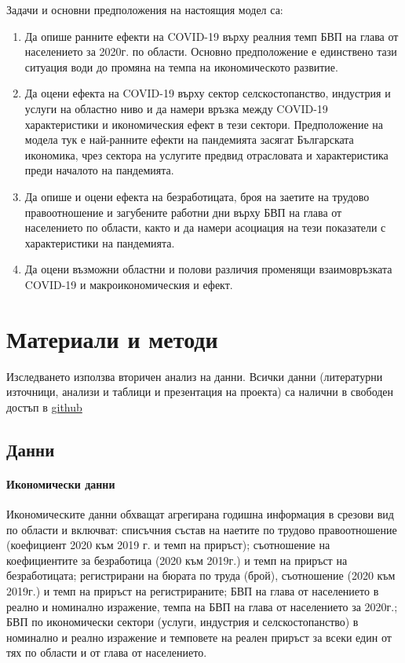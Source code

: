 \documentclass[a4paper,12pt]{article}
\begin{document}
Задачи и основни предположения на настоящия модел са:
\begin{enumerate}
\item Да опише ранните ефекти на COVID-19 върху реалния темп БВП на глава от населението за 2020г. по области. Основно предположение е единствено тази ситуация води до промяна на темпа на икономическото развитие. 
\item Да оцени ефекта на COVID-19 върху сектор селскостопанство, индустрия и услуги на областно ниво и да намери връзка между COVID-19 характеристики и икономическия ефект в тези сектори. Предположение на модела тук е най-ранните ефекти на пандемията засягат Българската икономика, чрез сектора на услугите предвид отрасловата и характеристика преди началото на пандемията. 
\item  Да опише и оцени ефекта на безработицата, броя на заетите на трудово правоотношение и загубените работни дни върху БВП на глава от населението по области, както и да намери асоциация на тези показатели с характеристики на пандемията.
\item Да оцени възможни областни и полови различия променящи взаимовръзката COVID-19 и макроикономическия и ефект.
\end{enumerate}

\section{Материали и методи}
Изследването използва вторичен анализ на данни. Всички данни (литературни източници, анализи и таблици и презентация на проекта) са налични в свободен достъп в  \href{https://github.com/kostadinoff/macroeconomics_SU_project.git}{github}  
\subsection{Данни}
\paragraph{Икономически данни}
Икономическите данни обхващат агрегирана годишна информация в срезови вид по области и включват: списъчния състав на наетите по трудово правоотношение (коефициент 2020 към 2019 г. и темп на приръст); съотношение на коефициентите за безработица (2020 към 2019г.) и темп на приръст на безработицата; регистрирани на бюрата по труда (брой), съотношение (2020 към 2019г.) и темп на приръст на регистрираните; БВП на глава от населението в реално и номинално изражение, темпа на БВП на глава от населението за 2020г.; БВП по икономически сектори (услуги, индустрия и селскостопанство) в номинално и реално изражение и темповете на реален приръст за всеки един от тях по области и от глава от населението. 
\end{document}
